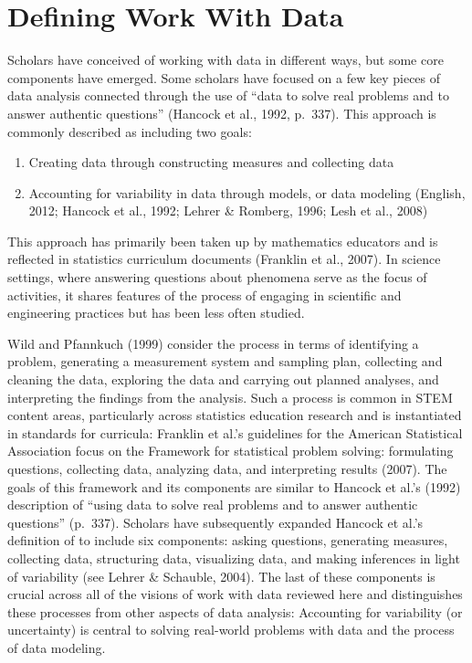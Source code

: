 \documentclass[]{msu-thesis}
\providecommand{\tightlist}{%
  \setlength{\itemsep}{0pt}\setlength{\parskip}{0pt}}
\theoremstyle{definition}
\theoremstyle{definition}
\theoremstyle{definition}
\theoremstyle{remark}
\begin{document}
\section{Defining Work With Data}\label{defining-work-with-data}

Scholars have conceived of working with data in different ways, but some
core components have emerged. Some scholars have focused on a few key
pieces of data analysis connected through the use of ``data to solve
real problems and to answer authentic questions'' (Hancock et al., 1992,
p.~337). This approach is commonly described as including two goals:

\begin{enumerate}
\def\labelenumi{\arabic{enumi}.}
\tightlist
\item
  Creating data through constructing measures and collecting data
\item
  Accounting for variability in data through models, or data modeling
  (English, 2012; Hancock et al., 1992; Lehrer \& Romberg, 1996; Lesh et
  al., 2008)
\end{enumerate}

This approach has primarily been taken up by mathematics educators and
is reflected in statistics curriculum documents (Franklin et al., 2007).
In science settings, where answering questions about phenomena serve as
the focus of activities, it shares features of the process of engaging
in scientific and engineering practices but has been less often studied.

Wild and Pfannkuch (1999) consider the process in terms of identifying a
problem, generating a measurement system and sampling plan, collecting
and cleaning the data, exploring the data and carrying out planned
analyses, and interpreting the findings from the analysis. Such a
process is common in STEM content areas, particularly across statistics
education research and is instantiated in standards for curricula:
Franklin et al.'s guidelines for the American Statistical Association
focus on the Framework for statistical problem solving: formulating
questions, collecting data, analyzing data, and interpreting results
(2007). The goals of this framework and its components are similar to
Hancock et al.'s (1992) description of ``using data to solve real
problems and to answer authentic questions'' (p.~337). Scholars have
subsequently expanded Hancock et al.'s definition of to include six
components: asking questions, generating measures, collecting data,
structuring data, visualizing data, and making inferences in light of
variability (see Lehrer \& Schauble, 2004). The last of these components
is crucial across all of the visions of work with data reviewed here and
distinguishes these processes from other aspects of data analysis:
Accounting for variability (or uncertainty) is central to solving
real-world problems with data and the process of data modeling.
\end{document}
